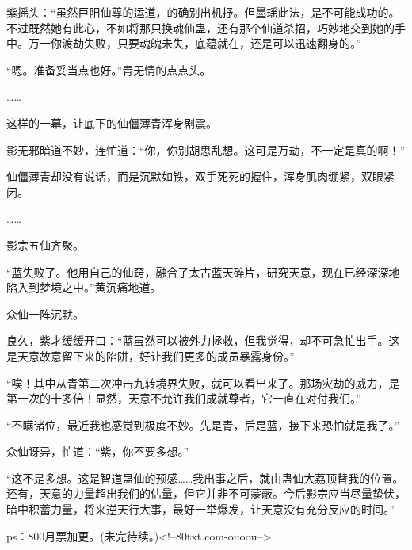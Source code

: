 \begin{this_body}
紫摇头：“虽然巨阳仙尊的运道，的确别出机抒。但墨瑶此法，是不可能成功的。不过既然她有此心，不如将那只换魂仙蛊，还有那个仙道杀招，巧妙地交到她的手中。万一你渡劫失败，只要魂魄未失，底蕴就在，还是可以迅速翻身的。”

“嗯。准备妥当点也好。”青无情的点点头。

……

这样的一幕，让底下的仙僵薄青浑身剧震。

影无邪暗道不妙，连忙道：“你，你别胡思乱想。这可是万劫，不一定是真的啊！”

仙僵薄青却没有说话，而是沉默如铁，双手死死的握住，浑身肌肉绷紧，双眼紧闭。

……

影宗五仙齐聚。

“蓝失败了。他用自己的仙窍，融合了太古蓝天碎片，研究天意，现在已经深深地陷入到梦境之中。”黄沉痛地道。

众仙一阵沉默。

良久，紫才缓缓开口：“蓝虽然可以被外力拯救，但我觉得，却不可急忙出手。这是天意故意留下来的陷阱，好让我们更多的成员暴露身份。”

“唉！其中从青第二次冲击九转境界失败，就可以看出来了。那场灾劫的威力，是第一次的十多倍！显然，天意不允许我们成就尊者，它一直在对付我们。”

“不瞒诸位，最近我也感觉到极度不妙。先是青，后是蓝，接下来恐怕就是我了。”

众仙讶异，忙道：“紫，你不要多想。”

“这不是多想。这是智道蛊仙的预感……我出事之后，就由蛊仙大荔顶替我的位置。还有，天意的力量超出我们的估量，但它并非不可蒙蔽。今后影宗应当尽量蛰伏，暗中积蓄力量，将来逆天行大事，最好一举爆发，让天意没有充分反应的时间。”

ps：800月票加更。(未完待续。)<!--80txt.com-ouoou-->

\end{this_body}


